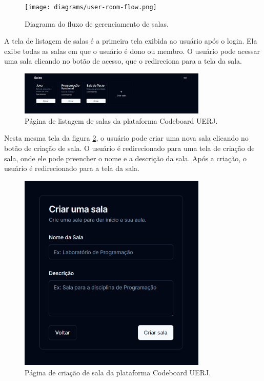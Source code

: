 \begin{figure}[H]
    \centering
    \texttt{[image: diagrams/user-room-flow.png]}
    \caption{Diagrama do fluxo de gerenciamento de salas.}
    \label{fig:user-room-flow}
\end{figure}

A tela de listagem de salas é a primeira tela exibida ao usuário após o login. Ela exibe todas as salas em que o usuário é dono ou membro. O usuário pode acessar uma sala clicando no botão de acesso, que o redireciona para a tela da sala.

\begin{figure}[H]
    \centering
    \includegraphics[width=0.8\textwidth]{assets/codeboard/rooms-page.png}
    \caption{Página de listagem de salas da plataforma Codeboard UERJ.}
    \label{fig:rooms-page}
\end{figure}

Nesta mesma tela da figura \ref{fig:rooms-page}, o usuário pode criar uma nova sala clicando no botão de criação de sala. O usuário é redirecionado para uma tela de criação de sala, onde ele pode preencher o nome e a descrição da sala. Após a criação, o usuário é redirecionado para a tela da sala.

\begin{figure}[H]
    \centering
    \includegraphics[width=0.8\textwidth]{assets/codeboard/create-room-page.png}
    \caption{Página de criação de sala da plataforma Codeboard UERJ.}
    \label{fig:create-room-page}
\end{figure}

